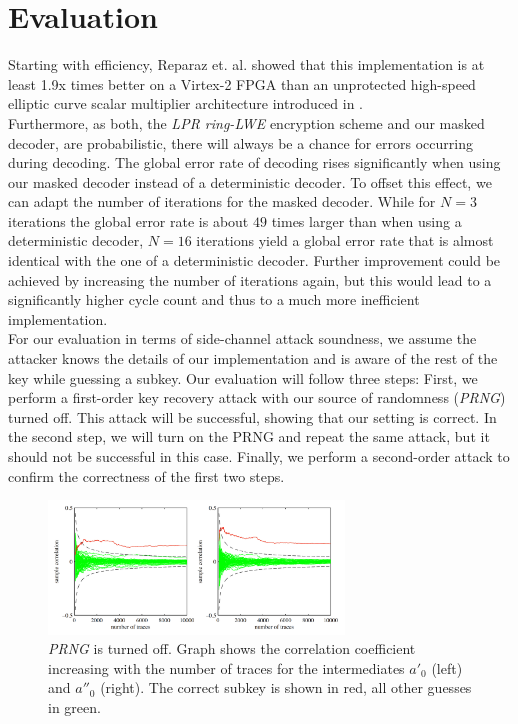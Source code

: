 
\section{Evaluation}
Starting with efficiency, Reparaz et. al. showed that this implementation is at least 1.9x times better on a Virtex-2 FPGA than an unprotected high-speed elliptic curve scalar multiplier architecture introduced in \cite{Rebeiro2012}.\\
Furthermore, as both, the \textit{\ac{LPR} \ac{ring-LWE}} encryption scheme and our masked decoder, are probabilistic, there will always be a chance for errors occurring during decoding. The global error rate of decoding rises significantly when using our masked decoder instead of a deterministic decoder. To offset this effect, we can adapt the number of iterations for the masked decoder. While for \(N=3\) iterations the global error rate is about \(49\) times larger than when using a deterministic decoder, \(N=16\) iterations yield a global error rate that is almost identical with the one of a deterministic decoder. Further improvement could be achieved by increasing the number of iterations again, but this would lead to a significantly higher cycle count and thus to a much more inefficient implementation.
\\For our evaluation in terms of side-channel attack soundness, we assume the attacker knows the details of our implementation and is aware of the rest of the key while guessing a subkey. Our evaluation will follow three steps: First, we perform a first-order key recovery attack with our source of randomness (\textit{\acs{PRNG}}) turned off. This attack will be successful, showing that our setting is correct. In the second step, we will turn on the PRNG and repeat the same attack, but it should not be successful in this case. Finally, we perform a second-order attack to confirm the correctness of the first two steps.
\begin{figure}[H]
	\centering
	\includegraphics[width=0.7\textwidth]{dpa_1.png}
	\caption{\textit{\acs{PRNG}} is turned off. Graph shows the correlation coefficient increasing with the number of traces for the intermediates \(a'_0\) (left) and \(a''_0\) (right). The correct subkey is shown in red, all other guesses in green. \cite{maskedRing}}
	\label{dpa_1}
\end{figure}
